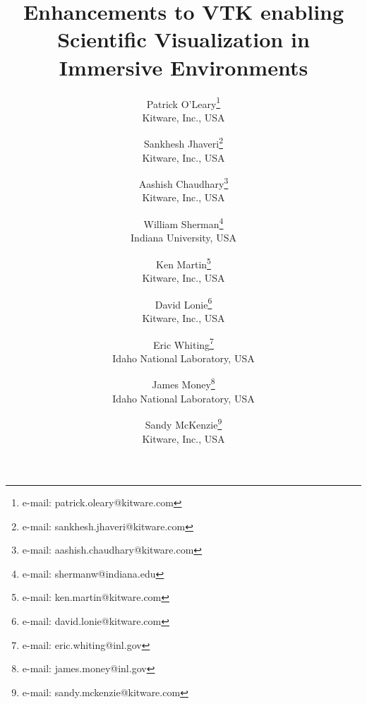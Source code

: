 \title{Enhancements to VTK enabling\\ Scientific Visualization in Immersive Environments}

\author{Patrick O'Leary\thanks{e-mail: patrick.oleary@kitware.com}\\ %
        \scriptsize Kitware, Inc., USA%
\and Sankhesh Jhaveri\thanks{e-mail: sankhesh.jhaveri@kitware.com}\\ %
        \scriptsize Kitware, Inc., USA %
\and Aashish Chaudhary\thanks{e-mail: aashish.chaudhary@kitware.com}\\ %
        \scriptsize Kitware, Inc., USA %
\and William Sherman\thanks{e-mail: shermanw@indiana.edu}\\ %
        \scriptsize Indiana University, USA %
\and Ken Martin\thanks{e-mail: ken.martin@kitware.com}\\ %
        \scriptsize Kitware, Inc., USA %
\and David Lonie\thanks{e-mail: david.lonie@kitware.com}\\ %
        \scriptsize Kitware, Inc., USA  %
\and Eric Whiting\thanks{e-mail: eric.whiting@inl.gov}\\ %
        \scriptsize Idaho National Laboratory, USA %
\and James Money\thanks{e-mail: james.money@inl.gov}\\ %
        \scriptsize Idaho National Laboratory, USA %
\and Sandy McKenzie\thanks{e-mail: sandy.mckenzie@kitware.com}\\ %
        \scriptsize Kitware, Inc., USA %
        }
